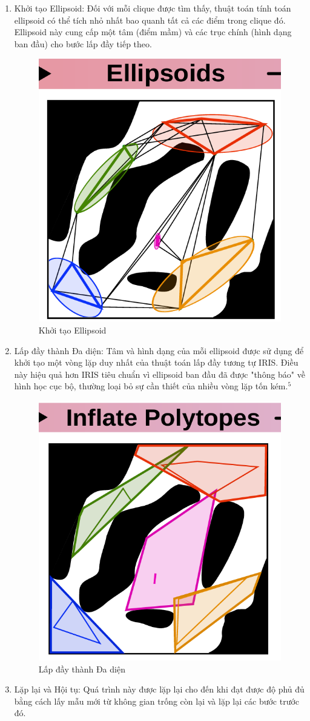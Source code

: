 \documentclass{article}
\begin{document}
\begin{enumerate}
\item Khởi tạo Ellipsoid: Đối với mỗi clique được tìm thấy, thuật toán tính toán ellipsoid có thể tích nhỏ nhất bao quanh tất cả các điểm trong clique đó. Ellipsoid này cung cấp một tâm (điểm mầm) và các trục chính (hình dạng ban đầu) cho bước lấp đầy tiếp theo.

\begin{figure}[H]
    \centering
    \includegraphics[width=0.5\linewidth]{imgs/VCC-3.png}
    \caption{Khởi tạo Ellipsoid}
\end{figure}

\item Lấp đầy thành Đa diện: Tâm và hình dạng của mỗi ellipsoid được sử dụng để khởi tạo một vòng lặp duy nhất của thuật toán lấp đầy tương tự IRIS. Điều này hiệu quả hơn IRIS tiêu chuẩn vì ellipsoid ban đầu đã được "thông báo" về hình học cục bộ, thường loại bỏ sự cần thiết của nhiều vòng lặp tốn kém.$^5$

\begin{figure}[H]
    \centering
    \includegraphics[width=0.45\linewidth]{imgs/VCC-4.png}
    \caption{Lấp đầy thành Đa diện}
\end{figure}

\item Lặp lại và Hội tụ: Quá trình này được lặp lại cho đến khi đạt được độ phủ đủ bằng cách lấy mẫu mới từ không gian trống còn lại và lặp lại các bước trước đó.



\end{enumerate}
\end{document}
